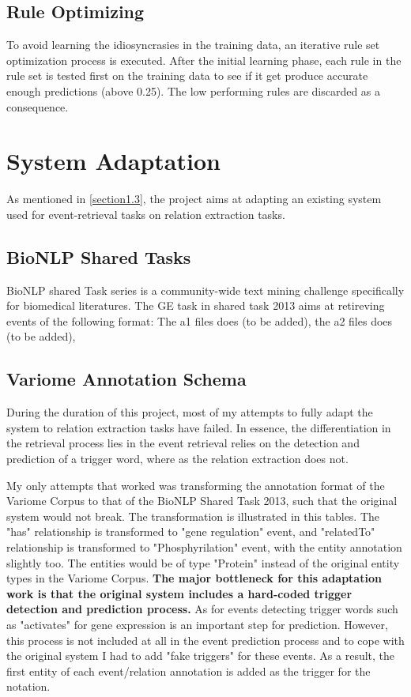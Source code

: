 \subsection{Rule Optimizing}
To avoid learning the idiosyncrasies in the training data, an iterative rule set optimization process is executed. After the initial learning phase, each rule in the rule set is tested first on the training data to see if it get produce accurate enough predictions (above 0.25). The low performing rules are discarded as a consequence.   
\section{System Adaptation}
As mentioned in \ref{section1.3}, the project aims at adapting an existing system used for event-retrieval tasks on relation extraction tasks.
\subsection{BioNLP Shared Tasks}
BioNLP shared Task series is a community-wide text mining challenge specifically for biomedical literatures. The GE task in shared task 2013 aims at retireving events of the following format:
The a1 files does (to be added), the a2 files does (to be added), 

\subsection{Variome Annotation Schema}


During the duration of this project, most of my attempts to fully adapt the system to relation extraction tasks have failed. In essence, the differentiation in the retrieval process lies in the event retrieval relies on the detection and prediction of a trigger word, where as the relation extraction does not. 

My only attempts that worked was transforming the annotation format of the Variome Corpus to that of the BioNLP Shared Task 2013, such that the original system would not break. The transformation is illustrated in this tables. The "has" relationship is transformed to "gene regulation" event, and "relatedTo" relationship is transformed to "Phosphyrilation" event, with the entity annotation slightly too. The entities would be of type "Protein" instead of the original entity types in the Variome Corpus. \textbf{The major bottleneck for this adaptation work is that the original system includes a hard-coded trigger detection and prediction process.} As for events detecting trigger words such as "activates" for gene expression is an important step for prediction. However, this process is not included at all in the event prediction process and to cope with the original system I had to add "fake triggers" for these events. \newline
As a result, the first entity of each event/relation annotation is added as the trigger for the notation. 


